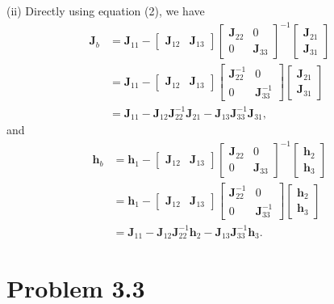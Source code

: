 \documentclass{article}
\newcommand{\qeds}{\hfill\qedsymbol}
\newcommand{\bm}{\mathbf}
\begin{document}
\noindent
(ii) Directly using equation (2), we have
\begin{align*}
	\bm{J}_b &= \bm{J}_{11} -
\begin{bmatrix}
    \bm{J}_{12} & \bm{J}_{13} 
\end{bmatrix}
\begin{bmatrix}
    \bm{J}_{22} & 0 \\
    0 & \bm{J}_{33}
\end{bmatrix}^{-1}
\begin{bmatrix}
    \bm{J}_{21} \\
    \bm{J}_{31}
\end{bmatrix} \\
&= \bm{J}_{11} -
\begin{bmatrix}
    \bm{J}_{12} & \bm{J}_{13} 
\end{bmatrix}
\begin{bmatrix}
    \bm{J}_{22}^{-1} & 0 \\
    0 & \bm{J}_{33}^{-1}
\end{bmatrix}
\begin{bmatrix}
    \bm{J}_{21} \\
    \bm{J}_{31}
\end{bmatrix}\\
&= \bm{J}_{11} - \bm{J}_{12}\bm{J}_{22}^{-1}\bm{J}_{21} - \bm{J}_{13}\bm{J}_{33}^{-1}\bm{J}_{31},
\end{align*}
and
\begin{align*}
	\bm{h}_b &= \bm{h}_1 - 
\begin{bmatrix}
    \bm{J}_{12} & \bm{J}_{13} 
\end{bmatrix}
\begin{bmatrix}
    \bm{J}_{22} & 0 \\
    0 & \bm{J}_{33}
\end{bmatrix}^{-1}
\begin{bmatrix}
    \bm{h}_{2} \\
    \bm{h}_{3}
\end{bmatrix} \\
&= \bm{h}_1 - 
\begin{bmatrix}
    \bm{J}_{12} & \bm{J}_{13} 
\end{bmatrix}
\begin{bmatrix}
    \bm{J}_{22}^{-1} & 0 \\
    0 & \bm{J}_{33}^{-1}
\end{bmatrix}
\begin{bmatrix}
    \bm{h}_{2} \\
    \bm{h}_{3}
\end{bmatrix} \\
&=\bm{J}_{11} - \bm{J}_{12}\bm{J}_{22}^{-1}\bm{h}_{2} - \bm{J}_{13}\bm{J}_{33}^{-1}\bm{h}_{3}.
\end{align*}\qeds
\pagebreak

\section*{Problem 3.3}
\end{document}
